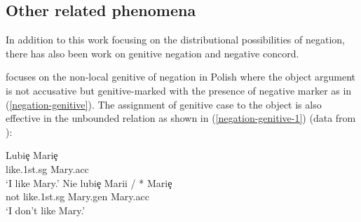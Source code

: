 \documentclass[output=paper
                ,modfonts
                ,nonflat
	        ,collection
	        ,collectionchapter
	        ,collectiontoclongg
 	        ,biblatex
                ,babelshorthands
                ,newtxmath
                ,draftmode
                ,colorlinks, citecolor=brown
]{./langsci/langscibook}
\begin{document}
{\begin{exe}
\begin{xlist}
\ea
{}
\z

\iffalse{
The VSO language Welsh also employs a preverbal
negative, as illustrated by \citet{BJ:00}:

\ea
\ex \label{negation-NC-1a}
\gll Ni chaf sefyll yma \\
     {\sc neg} can stand here\\
\glt `I can't stand here.'
\z
%
As given in (\ref{negation-NC-1a}), Welsh allows the preverbal
particle \type{ni} to occur in the preverbal position.
%
With treating the negative particle to form a negative word
with the following stem, \citet{BJ:00} offer a selectional
analysis of negation.
That is, the finite negative verb selects
two complements (e.g., subject and object) while
the nonfinite negative verb selects a VP.}\fi

\section{Other related phenomena}

In addition to this work focusing on the distributional possibilities
 of negation, there has also been work on genitive negation and negative concord.

 \citet{Prz:00} focuses on the non-local genitive of negation in Polish where the object argument is not 
 accusative but genitive-marked with the presence of negative marker as in (\ref{negation-genitive}). 
  The assignment of genitive case to the object is also effective in
  the unbounded relation as shown in (\ref{negation-genitive-1}) (data from \citealt{Prz:00}):

\eal
\ex  \label{negation-genitive}
\gll Lubi\c{e} Mari\c{e} \\
     like.1st.{\sc sg} Mary.{\sc acc}\\
\glt `I like Mary.'
\ex
\gll Nie lubi\c{e} Marii / * Mari\c{e} \\
     not like.1st.{\sc sg} Mary.{\sc gen} {} {} Mary.{\sc acc}\\
\glt `I don't like Mary.'
\zl


\end{xlist}
\end{exe}}
\end{document}
